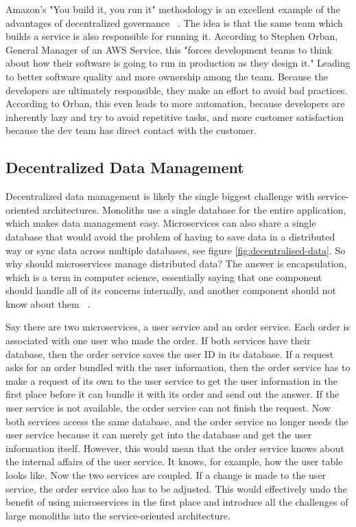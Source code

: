 Amazon's "You build it, you run it" methodology is an excellent example of the advantages of decentralized governance ~\cite{amazon.2015}. The idea is that the same team which builds a service is also responsible for running it. According to Stephen Orban, General Manager of an AWS Service, this "forces development teams to think about how their software is going to run in production as they design it." Leading to better software quality and more ownership among the team. Because the developers are ultimately responsible,  they make an effort to avoid bad practices. According to Orban, this even leads to more automation, because developers are inherently lazy and try to avoid repetitive tasks, and more customer satisfaction because the dev team has direct contact with the customer.


\subsection{Decentralized Data Management}
\label{sec:theory:decentralized-data}

Decentralized data management is likely the single biggest challenge with service-oriented architectures. Monoliths use a single database for the entire application, which makes data management easy. Microservices can also share a single database that would avoid the problem of having to save data in a distributed way or sync data across multiple databases, see figure \ref{fig:decentralised-data}. So why should microservices manage distributed data? The answer is encapsulation, which is a term in computer science, essentially saying that one component should handle all of its concerns internally, and another component should not know about them ~\cite{krivtsov.2019}.

Say there are two microservices, a user service and an order service. Each order is associated with one user who made the order. If both services have their database, then the order service saves the user ID in its database. If a request asks for an order bundled with the user information, then the order service has to make a request of its own to the user service to get the user information in the first place before it can bundle it with its order and send out the answer. If the user service is not available, the order service can not finish the request. Now both services access the same database, and the order service no longer needs the user service because it can merely get into the database and get the user information itself. However, this would mean that the order service knows about the internal affairs of the user service. It knows, for example, how the user table looks like. Now the two services are coupled. If a change is made to the user service, the order service also has to be adjusted. This would effectively undo the benefit of using microservices in the first place and introduce all the challenges of large monoliths into the service-oriented architecture.

